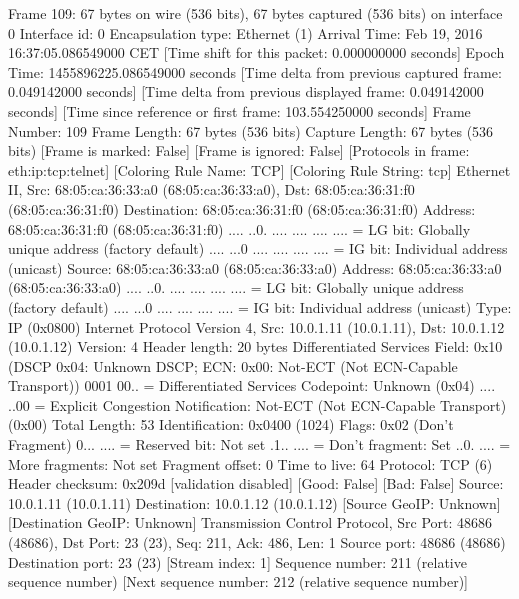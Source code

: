 Frame 109: 67 bytes on wire (536 bits), 67 bytes captured (536 bits) on interface 0
    Interface id: 0
    Encapsulation type: Ethernet (1)
    Arrival Time: Feb 19, 2016 16:37:05.086549000 CET
    [Time shift for this packet: 0.000000000 seconds]
    Epoch Time: 1455896225.086549000 seconds
    [Time delta from previous captured frame: 0.049142000 seconds]
    [Time delta from previous displayed frame: 0.049142000 seconds]
    [Time since reference or first frame: 103.554250000 seconds]
    Frame Number: 109
    Frame Length: 67 bytes (536 bits)
    Capture Length: 67 bytes (536 bits)
    [Frame is marked: False]
    [Frame is ignored: False]
    [Protocols in frame: eth:ip:tcp:telnet]
    [Coloring Rule Name: TCP]
    [Coloring Rule String: tcp]
Ethernet II, Src: 68:05:ca:36:33:a0 (68:05:ca:36:33:a0), Dst: 68:05:ca:36:31:f0 (68:05:ca:36:31:f0)
    Destination: 68:05:ca:36:31:f0 (68:05:ca:36:31:f0)
        Address: 68:05:ca:36:31:f0 (68:05:ca:36:31:f0)
        .... ..0. .... .... .... .... = LG bit: Globally unique address (factory default)
        .... ...0 .... .... .... .... = IG bit: Individual address (unicast)
    Source: 68:05:ca:36:33:a0 (68:05:ca:36:33:a0)
        Address: 68:05:ca:36:33:a0 (68:05:ca:36:33:a0)
        .... ..0. .... .... .... .... = LG bit: Globally unique address (factory default)
        .... ...0 .... .... .... .... = IG bit: Individual address (unicast)
    Type: IP (0x0800)
Internet Protocol Version 4, Src: 10.0.1.11 (10.0.1.11), Dst: 10.0.1.12 (10.0.1.12)
    Version: 4
    Header length: 20 bytes
    Differentiated Services Field: 0x10 (DSCP 0x04: Unknown DSCP; ECN: 0x00: Not-ECT (Not ECN-Capable Transport))
        0001 00.. = Differentiated Services Codepoint: Unknown (0x04)
        .... ..00 = Explicit Congestion Notification: Not-ECT (Not ECN-Capable Transport) (0x00)
    Total Length: 53
    Identification: 0x0400 (1024)
    Flags: 0x02 (Don't Fragment)
        0... .... = Reserved bit: Not set
        .1.. .... = Don't fragment: Set
        ..0. .... = More fragments: Not set
    Fragment offset: 0
    Time to live: 64
    Protocol: TCP (6)
    Header checksum: 0x209d [validation disabled]
        [Good: False]
        [Bad: False]
    Source: 10.0.1.11 (10.0.1.11)
    Destination: 10.0.1.12 (10.0.1.12)
    [Source GeoIP: Unknown]
    [Destination GeoIP: Unknown]
Transmission Control Protocol, Src Port: 48686 (48686), Dst Port: 23 (23), Seq: 211, Ack: 486, Len: 1
    Source port: 48686 (48686)
    Destination port: 23 (23)
    [Stream index: 1]
    Sequence number: 211    (relative sequence number)
    [Next sequence number: 212    (relative sequence number)]
